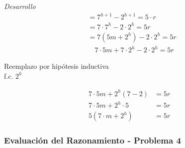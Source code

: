 \documentclass{article}
\begin{document}
\textit{Desarrollo}
\begin{align*}
    &=7^{h+1} - 2^{h+1} = 5 \cdot r \\
    &= 7 \cdot 7^h - 2 \cdot 2^h = 5r \\
    &= 7(5m + 2^h) - 2 \cdot 2^h = 5r \\
    &\quad 7 \cdot 5m + 7 \cdot 2^h - 2 \cdot 2^h = 5r
\end{align*}

\noindent Reemplazo por hipótesis inductiva \\
\noindent f.c. $2^h$

\begin{align*}
    7 \cdot 5m + 2^h (7 - 2) &= 5r \\
    7 \cdot 5m + 2^h \cdot 5 &= 5r \\
    5(7 \cdot m + 2^h) &= 5r
\end{align*}

\subsubsection{Evaluación del Razonamiento - Problema 4}
\label{sec:evaluacion-4}
\end{document}
